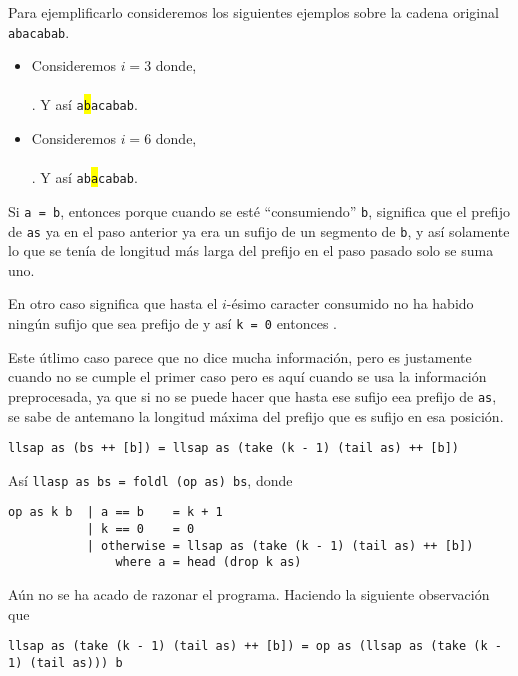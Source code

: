 Para ejemplificarlo consideremos los siguientes ejemplos sobre la cadena original \texttt{abacabab}.
\begin{itemize}
\item Consideremos $i = 3$ donde,\\
\\
.
Y así \texttt{a\colorbox{yellow}b}\texttt{acabab}.
\item Consideremos $i = 6$ donde,\\
\\
.
Y así \texttt{ab\colorbox{yellow}a}\texttt{cabab}.
\end{itemize}

Si \texttt{a = b}, entonces  porque cuando se esté
``consumiendo'' \texttt{b}, significa que el prefijo de \texttt{as} ya en el paso anterior ya era
un sufijo de un segmento de \texttt{b}, y así solamente lo que se tenía de longitud más larga del
prefijo en el paso pasado solo se suma uno.

En otro caso significa que hasta el $i$-ésimo caracter consumido no ha habido ningún sufijo que sea
prefijo de y así \texttt{k = 0} entonces .

Este útlimo caso parece que no dice mucha información, pero es justamente cuando no se cumple el primer
caso pero es aquí cuando se usa la información preprocesada, ya que si no se puede hacer que hasta ese sufijo
eea prefijo de \texttt{as}, se sabe de antemano la longitud máxima del prefijo que es sufijo en esa posición.
\begin{verbatim}
llsap as (bs ++ [b]) = llsap as (take (k - 1) (tail as) ++ [b])
\end{verbatim}

Así \texttt{llasp as bs = foldl (op as) bs}, donde
\begin{verbatim}
op as k b  | a == b    = k + 1
           | k == 0    = 0
           | otherwise = llsap as (take (k - 1) (tail as) ++ [b])
               where a = head (drop k as)
\end{verbatim}

Aún no se ha acado de razonar el programa. Haciendo la siguiente observación que
\begin{verbatim}
llsap as (take (k - 1) (tail as) ++ [b]) = op as (llsap as (take (k - 1) (tail as))) b
\end{verbatim}

